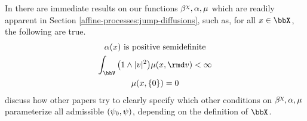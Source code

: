 \begin{remark}
  In \cite{cuchiero2011} there are immediate results on our functions $\beta^\chi, \alpha, \mu$ which are readily apparent in Section \ref{affine-processes:jump-diffusions}, such as, for all $\stateVar \in \stateSpace$, the following are true.
  \begin{equation}
    \begin{gathered}
      \affDiff(\stateVar) \text{ is positive semidefinite} \\
      \int_\vecSpace \big(1 \wedge |\markVar|^2 \big) \affJump(\stateVar, \rmd\markVar) < \infty \\
      \affJump(\stateVar, \{0\}) = 0
    \end{gathered}
  \end{equation}
  \color{gray}
  discuss how other papers try to clearly specify which other conditions on $\beta^\chi, \alpha, \mu$ parameterize all admissible $(\psi_0, \psi)$, depending on the definition of $\stateSpace$.
\end{remark}
